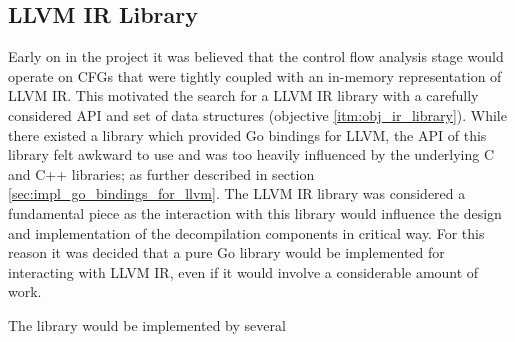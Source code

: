 
\subsection{LLVM IR Library}
\label{sec:impl_llvm_ir_library}

Early on in the project it was believed that the control flow analysis stage would operate on CFGs that were tightly coupled with an in-memory representation of LLVM IR. This motivated the search for a LLVM IR library with a carefully considered API and set of data structures (objective \ref{itm:obj_ir_library}). While there existed a library which provided Go bindings for LLVM, the API of this library felt awkward to use and was too heavily influenced by the underlying C and C++ libraries; as further described in section \ref{sec:impl_go_bindings_for_llvm}. The LLVM IR library was considered a fundamental piece as the interaction with this library would influence the design and implementation of the decompilation components in critical way. For this reason it was decided that a pure Go library would be implemented for interacting with LLVM IR, even if it would involve a considerable amount of work.

The library would be implemented by several






